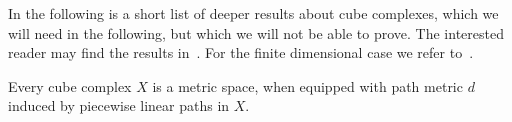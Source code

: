 
In the following is a short list of deeper results about cube complexes, which we will need in the following, but which we will not be able to prove. The interested reader may find the results in~\cite[Appendices A, B]{MR3029427}. For the finite dimensional case we refer to~\cite[Sec. I.7, II.5]{MR1744486}.

\begin{thm}[{\cite[I.7.10]{MR1744486}}]
  Every cube complex \(X\) is a metric space, when equipped with path metric \(d\) induced by piecewise linear paths in \(X\).
\end{thm}


